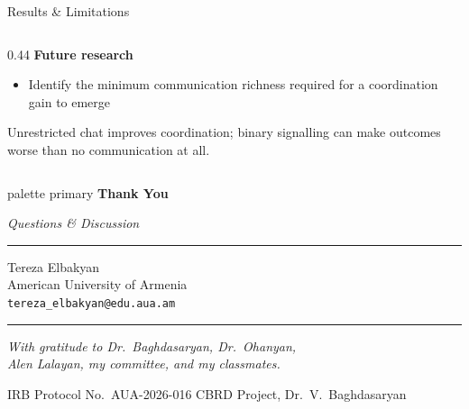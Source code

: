 \documentclass[aspectratio=169,10pt]{beamer}
\begin{document}
\begin{frame}{Results \& Limitations}
\begin{columns}[T]
\begin{column}{0.44\textwidth}
    \vspace{0.3em}
    \small\textbf{Future research}
    \begin{itemize}\footnotesize
      \item Identify the minimum communication richness required for a coordination gain to emerge
    \end{itemize}

    \vspace{0.25em}
    \begin{block}{}
      \small
      Unrestricted chat improves coordination;
      binary signalling can make outcomes worse than no communication at all.
    \end{block}
  \end{column}
\end{columns}

\end{frame}

\begin{frame}[plain]
  \begin{beamercolorbox}[wd=\paperwidth,ht=\paperheight]{palette primary}
    \vspace*{2.2em}
    \centering
    {\Large\bfseries\color{white} Thank You}\par
    \vspace{0.9em}
    {\normalsize\color{white!80}\textit{Questions \& Discussion}}\par
    \vspace{1.2em}
    \textcolor{white!40}{\rule{0.40\paperwidth}{0.4pt}}\par
    \vspace{1.0em}
    {\small\color{white!88}
      Tereza Elbakyan\\[0.3em]
      American University of Armenia\\[0.3em]
      \texttt{tereza\_elbakyan@edu.aua.am}
    }\par
    \vspace{1.1em}
    \textcolor{white!35}{\rule{0.32\paperwidth}{0.4pt}}\par
    \vspace{0.8em}
    {\normalsize\color{white!72}\itshape
      With gratitude to Dr.~Baghdasaryan, Dr.~Ohanyan,\\[0.2em]
      Alen Lalayan, my committee, and my classmates.\par}
    \vspace{0.9em}
    {\small\color{white!55}
      IRB Protocol No.~AUA-2026-016 \quad\textbullet\quad
      CBRD Project, Dr.~V.~Baghdasaryan\par}
  \end{beamercolorbox}
\end{frame}

\end{document}
